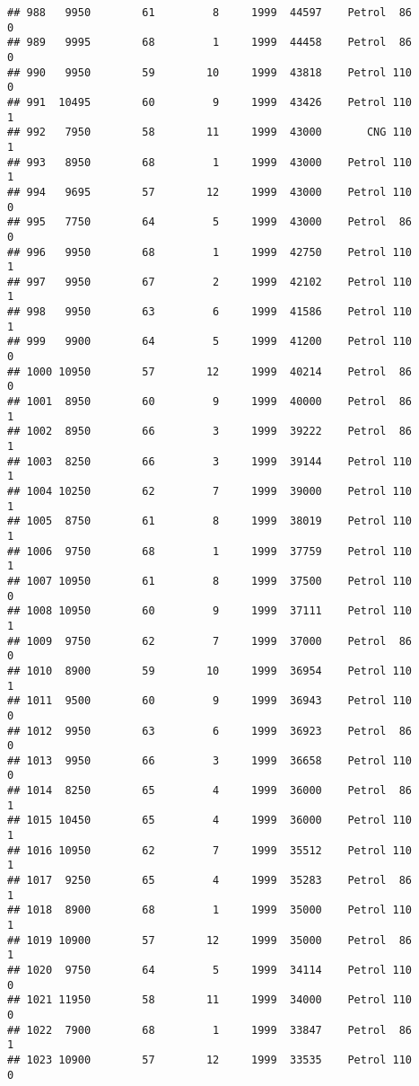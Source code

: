 \documentclass[]{article}
\begin{document}
\begin{verbatim}
## 988   9950        61         8     1999  44597    Petrol  86         0
## 989   9995        68         1     1999  44458    Petrol  86         0
## 990   9950        59        10     1999  43818    Petrol 110         0
## 991  10495        60         9     1999  43426    Petrol 110         1
## 992   7950        58        11     1999  43000       CNG 110         1
## 993   8950        68         1     1999  43000    Petrol 110         1
## 994   9695        57        12     1999  43000    Petrol 110         0
## 995   7750        64         5     1999  43000    Petrol  86         0
## 996   9950        68         1     1999  42750    Petrol 110         1
## 997   9950        67         2     1999  42102    Petrol 110         1
## 998   9950        63         6     1999  41586    Petrol 110         1
## 999   9900        64         5     1999  41200    Petrol 110         0
## 1000 10950        57        12     1999  40214    Petrol  86         0
## 1001  8950        60         9     1999  40000    Petrol  86         1
## 1002  8950        66         3     1999  39222    Petrol  86         1
## 1003  8250        66         3     1999  39144    Petrol 110         1
## 1004 10250        62         7     1999  39000    Petrol 110         1
## 1005  8750        61         8     1999  38019    Petrol 110         1
## 1006  9750        68         1     1999  37759    Petrol 110         1
## 1007 10950        61         8     1999  37500    Petrol 110         0
## 1008 10950        60         9     1999  37111    Petrol 110         1
## 1009  9750        62         7     1999  37000    Petrol  86         0
## 1010  8900        59        10     1999  36954    Petrol 110         1
## 1011  9500        60         9     1999  36943    Petrol 110         0
## 1012  9950        63         6     1999  36923    Petrol  86         0
## 1013  9950        66         3     1999  36658    Petrol 110         0
## 1014  8250        65         4     1999  36000    Petrol  86         1
## 1015 10450        65         4     1999  36000    Petrol 110         1
## 1016 10950        62         7     1999  35512    Petrol 110         1
## 1017  9250        65         4     1999  35283    Petrol  86         1
## 1018  8900        68         1     1999  35000    Petrol 110         1
## 1019 10900        57        12     1999  35000    Petrol  86         1
## 1020  9750        64         5     1999  34114    Petrol 110         0
## 1021 11950        58        11     1999  34000    Petrol 110         0
## 1022  7900        68         1     1999  33847    Petrol  86         1
## 1023 10900        57        12     1999  33535    Petrol 110         0

\end{verbatim}
\end{document}
